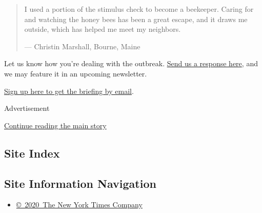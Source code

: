 \begin{quote}
I used a portion of the stimulus check to become a beekeeper. Caring for
and watching the honey bees has been a great escape, and it draws me
outside, which has helped me meet my neighbors.

--- Christin Marshall, Bourne, Maine
\end{quote}

Let us know how you're dealing with the outbreak.
\href{https://www.nytimes3xbfgragh.onion/2020/03/02/reader-center/coronavirus-preparation.html}{Send
us a response here}, and we may feature it in an upcoming newsletter.

\href{https://www.nytimes3xbfgragh.onion/newsletters/coronavirus-briefing}{Sign
up here to get the briefing by email}.

Advertisement

\protect\hyperlink{after-bottom}{Continue reading the main story}

\hypertarget{site-index}{%
\subsection{Site Index}\label{site-index}}

\hypertarget{site-information-navigation}{%
\subsection{Site Information
Navigation}\label{site-information-navigation}}

\begin{itemize}
\tightlist
\item
  \href{https://help.nytimes3xbfgragh.onion/hc/en-us/articles/115014792127-Copyright-notice}{©~2020~The
  New York Times Company}
\end{itemize}

